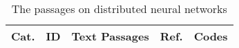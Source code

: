 {\tiny
\begin{longtable}[H]{|l|p{0.6cm}|p{11.8cm}|p{0.6cm}|p{2cm}|}
	\caption{The passages on distributed neural networks}\label{tab:dnn_passages}                                                                                                                                                                                                                                                                                                                                                                                                                                                              \\

	\toprule
	\textbf{Cat.} & \centering \textbf{ID} & \textbf{Text Passages}                                                                                                                                                                                                                                                                                                                                                                                                                                                                                              & \textbf{Ref.} & \textbf{Codes} \\
	\midrule
	\endfirsthead


\end{longtable}}
